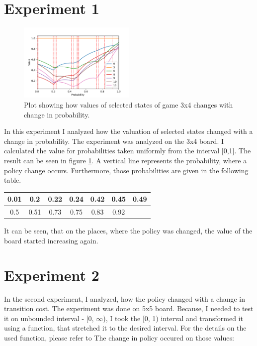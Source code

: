 \documentclass[10pt,journal,compsoc,twoside]{IEEEtran}
\begin{document}
\section*{Experiment 1}\label{sec:experiment1}
\begin{figure}
    \caption{Plot showing how values of selected states of game 3x4 changes with change in probability.}
    \label{fig:experiment1}
    \centering
        \includegraphics[width=0.5\textwidth, angle=0]{figures/e1.pdf}
\end{figure}
In this experiment I analyzed how the valuation of selected
states changed with a change in probability. The experiment was
analyzed on the 3x4 board. I calculated the value for probabilities taken
uniformly from the interval [0,1]. The result can be seen in
figure \ref{fig:experiment1}. A vertical line represents the probability,
where a policy change occurs. Furthermore, those probabilities are given in the following table.
\begin{center}
    \begin{tabular}{ | c | c | c | c | c |  c| c |}
      \hline
      0.01 & 0.2 & 0.22 & 0.24 & 0.42 & 0.45 & 0.49 \\ \hline
       0.5 & 0.51 & 0.73 & 0.75 & 0.83 & 0.92 & \\
      \hline
    \end{tabular}
  \end{center}

It can be seen, that on the places, where the policy was changed, the value of the board started increasing again.

\section*{Experiment 2}\label{sec:experiment2}


In the second experiment, I analyzed, how the policy changed with a change in transition cost.
The experiment was done on 5x5 board.
Because, I needed to test it on unbounded interval - [0, $\infty$),
I took the [0, 1) interval and transformed it using a function, that stretched it to the desired interval.
For the details on the used function, please refer to 
The change in policy occured on those values:
\end{document}
